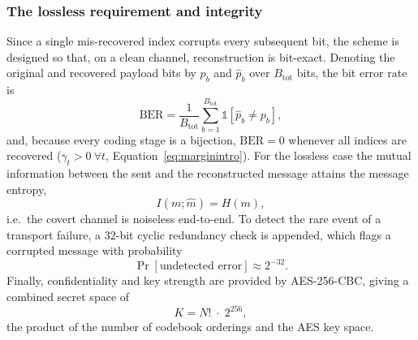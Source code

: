 \documentclass[10pt,a4paper]{article}
\theoremstyle{definition}
\begin{document}
\subsubsection{The lossless requirement and integrity}\label{sec:lossless}
Since a single mis-recovered index corrupts every subsequent bit, the scheme is
designed so that, on a clean channel, reconstruction is bit-exact. Denoting the
original and recovered payload bits by $p_b$ and $\hat p_b$ over $B_{\text{tot}}$
bits, the bit error rate is
\begin{equation}
  \mathrm{BER}=\frac{1}{B_{\text{tot}}}\sum_{b=1}^{B_{\text{tot}}}
        \mathbb{1}\!\left[\hat p_b\neq p_b\right],
  \label{eq:berintro}
\end{equation}
and, because every coding stage is a bijection, $\mathrm{BER}=0$ whenever all
indices are recovered ($\gamma_t>0\ \forall t$, Equation~\eqref{eq:marginintro}). For the
lossless case the mutual information between the sent and the reconstructed
message attains the message entropy,
\begin{equation}
  I(m;\hat m)=H(m),
  \label{eq:mutual}
\end{equation}
i.e.\ the covert channel is noiseless end-to-end. To detect the rare event of a
transport failure, a $32$-bit cyclic redundancy check is appended, which flags a
corrupted message with probability
\begin{equation}
  \Pr[\text{undetected error}]\approx 2^{-32}.
  \label{eq:crc}
\end{equation}
Finally, confidentiality and key strength are provided by AES-256-CBC, giving a
combined secret space of
\begin{equation}
  K = N!\;\cdot\;2^{256},
  \label{eq:keyspaceintro}
\end{equation}
the product of the number of codebook orderings and the AES key space.
\end{document}
